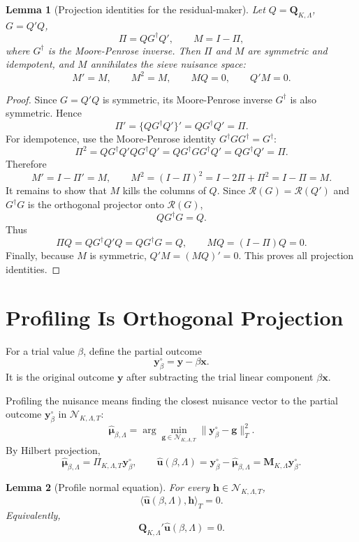 \documentclass[12pt]{article}
\numberwithin{equation}{section}
\newtheorem{lemma}{Lemma}
\theoremstyle{definition}
\newcommand{\N}{\mathcal N}
\newcommand{\innerT}[2]{\langle #1,#2\rangle_T}
\begin{document}
\begin{lemma}[Projection identities for the residual-maker]
\label{lem:projection-identities}
Let \(Q=\bm Q_{K,\Lambda}\), \(G=Q'Q\),
\[
    \Pi=QG^\dagger Q',
    \qquad
    M=I-\Pi,
\]
where \(G^\dagger\) is the Moore-Penrose inverse. Then \(\Pi\) and \(M\) are
symmetric and idempotent, and \(M\) annihilates the sieve nuisance space:
\[
    M'=M,
    \qquad
    M^2=M,
    \qquad
    MQ=0,
    \qquad
    Q'M=0.
\]
\end{lemma}

\begin{proof}
Since \(G=Q'Q\) is symmetric, its Moore-Penrose inverse \(G^\dagger\) is also
symmetric. Hence
\[
    \Pi'=\{QG^\dagger Q'\}'=QG^\dagger Q'=\Pi.
\]
For idempotence, use the Moore-Penrose identity
\(G^\dagger GG^\dagger=G^\dagger\):
\[
    \Pi^2
    =QG^\dagger Q'QG^\dagger Q'
    =QG^\dagger GG^\dagger Q'
    =QG^\dagger Q'
    =\Pi.
\]
Therefore
\[
    M'=I-\Pi'=M,
    \qquad
    M^2=(I-\Pi)^2=I-2\Pi+\Pi^2=I-\Pi=M.
\]
It remains to show that \(M\) kills the columns of \(Q\). Since
\(\mathcal R(G)=\mathcal R(Q')\) and \(G^\dagger G\) is the orthogonal projector
onto \(\mathcal R(G)\),
\[
    QG^\dagger G=Q.
\]
Thus
\[
    \Pi Q=QG^\dagger Q'Q=QG^\dagger G=Q,
    \qquad
    MQ=(I-\Pi)Q=0.
\]
Finally, because \(M\) is symmetric, \(Q'M=(MQ)'=0\). This proves all projection
identities.
\end{proof}

\section{Profiling Is Orthogonal Projection}

For a trial value \(\beta\), define the partial outcome
\[
    \bm y_\beta^\circ=\bm y-\beta\bm x.
\]
It is the original outcome \(\bm y\) after subtracting the trial linear component
\(\beta\bm x\).

Profiling the nuisance means finding the closest nuisance vector to the partial
outcome \(\bm y_\beta^\circ\) in \(\N_{K,\Lambda,T}\):
\[
    \widehat{\bm\mu}_{\beta,\Lambda}
    =\arg\min_{\bm g\in\N_{K,\Lambda,T}}\|\bm y_\beta^\circ-\bm g\|_T^2.
\]
By Hilbert projection,
\[
    \widehat{\bm\mu}_{\beta,\Lambda}=\Pi_{K,\Lambda,T}\bm y_\beta^\circ,
    \qquad
    \widehat{\bm u}(\beta,\Lambda)=\bm y_\beta^\circ-\widehat{\bm\mu}_{\beta,\Lambda}
    =\bm M_{K,\Lambda}\bm y_\beta^\circ.
\]

\begin{lemma}[Profile normal equation]
For every \(\bm h\in\N_{K,\Lambda,T}\),
\[
    \innerT{\widehat{\bm u}(\beta,\Lambda)}{\bm h}=0.
\]
Equivalently,
\[
    \bm Q_{K,\Lambda}'\widehat{\bm u}(\beta,\Lambda)=0.
\]
\end{lemma}
\end{document}
